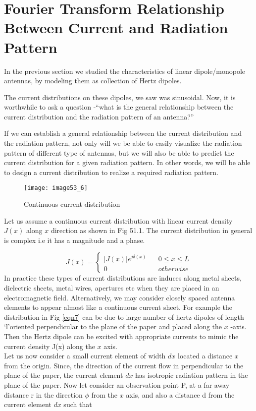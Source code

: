 \chapter{Fourier Transform Relationship Between Current and Radiation Pattern}
In the previous section we studied the characteristics of linear dipole/monopole antennas, by modeling them as collection of Hertz dipoles. 

The current distributions on these dipoles, we saw was sinusoidal. Now, it is worthwhile to ask a question -\textquotedblleft  what is the general relationship between the current distribution and the radiation pattern of an antenna?\textquotedblright

If we can establish a general relationship between the current distribution and the radiation pattern, not only will we be able to easily visualize the radiation pattern of different type of antennas, but we will also be able to predict the current distribution for a given radiation pattern. In other words, we will be able to design a current distribution to realize a required radiation pattern.
\begin{figure}[h]
	\centering
	\texttt{[image: image53\_6]}
	\caption{Continuous current distribution}
	\label{fig:fig6}
\end{figure}

Let us assume a continuous current distribution with linear current density $J(x)$ along $x$ direction as shown in Fig 51.1. The current distribution in general is complex i.e it has a magnitude and a phase.

\begin{equation}
J(x) =
\begin{cases}
|J(x)| e^{j\delta (x)} \ \ \ \ & 0\le x \le L \\
0  & otherwise
\end{cases}
\end{equation}
In practice these types of current distributions are induces along metal sheets, dielectric sheets, metal wires, apertures etc when they are placed  in an electromagnetic field. Alternatively, we may consider closely spaced antenna elements to appear almost like a continuous current sheet. For example the distribution in Fig \ref{eqn7} can be due to large number of hertz dipoles of length \textquoteleft l\textquoteright oriented perpendicular to the plane of the paper and placed along the $x$ -axis. Then the Hertz dipole can be excited with appropriate currents to mimic the current density J(x) along the $x$ axis.\\
Let us now consider a small current element of width $dx$ located a distance $x$ from the origin. Since, the direction of the current flow in perpendicular to the plane of the paper, the current element $dx$ has isotropic radiation pattern in the plane of the paper. Now let consider an observation  point P, at a far away distance r in the direction $\phi$ from the $x$ axis, and also a distance d from the current element $dx$ such that

